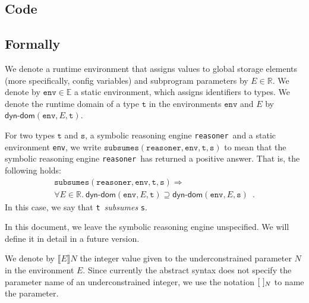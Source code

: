 \documentclass{book}
\newcommand\dynamicdomain[0]{\textsf{dyn-dom}}
\newcommand\tenv[0]{\texttt{env}}
\newcommand\vt[0]{\texttt{t}}
\newcommand\vs[0]{\texttt{s}}
\begin{document}
  \subsection{Code}

\begin{emptyformal}
      \subsection{Formally}
      \newcommand\runtimeenv[0]{E}

      \newcommand\subsumes[0]{\texttt{subsumes}}
      \newcommand\reasoner[0]{\texttt{reasoner}}

      We denote a runtime environment that assigns values to global storage elements (more specifically, config variables)
      and subprogram parameters by $E \in \mathbb{R}$.
      We denote by $\tenv \in \mathbb{E}$ a static environment, which assigns identifiers to types.
      We denote the runtime domain of a type $\vt$ in the environments $\tenv$ and $E$ by $\dynamicdomain(\tenv, E, \vt)$.
      
      For two types $\vt$ and $\vs$, a symbolic reasoning engine \reasoner\ and a static environment \tenv,
      we write $\subsumes(\reasoner, \tenv, \vt, \vs)$ to mean that the symbolic reasoning
      engine \reasoner\ has returned a positive answer. That is, the following holds:
      \[
        \begin{array}{l}
        \subsumes(\reasoner, \tenv, \vt, \vs) \Rightarrow \\
       \forall E\in\mathbb{R}.\ \dynamicdomain(\tenv, E, \vt) \supseteq \dynamicdomain(\tenv, E, \vs) \enspace.
        \end{array}
      \]
      In this case, we say that \vt\ \emph{subsumes} \vs.

      In this document, we leave the symbolic reasoning engine unspecified. We will define it in detail in a future version.

We denote by $\llbracket \runtimeenv \rrbracket N$ the integer value given to the underconstrained parameter $N$ in the environment $\runtimeenv$.
%
Since currently the abstract syntax does not specify the parameter name of an underconstrained integer,
we use the notation $[\ ]_N$ to name the parameter.


\end{emptyformal}
\end{document}
